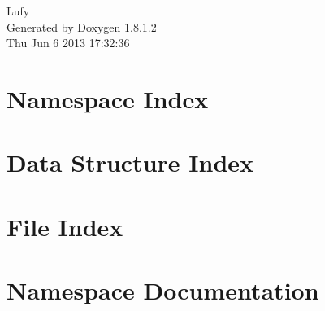 \documentclass{book}
\begin{document}
\hypersetup{pageanchor=false,citecolor=blue}
\begin{titlepage}
\vspace*{7cm}
\begin{center}
{\Large Lufy }\\
\vspace*{1cm}
{\large Generated by Doxygen 1.8.1.2}\\
\vspace*{0.5cm}
{\small Thu Jun 6 2013 17:32:36}\\
\end{center}
\end{titlepage}
\clearemptydoublepage
{}
\tableofcontents
\clearemptydoublepage
{}
\hypersetup{pageanchor=true,citecolor=blue}
\chapter{Namespace Index}

\chapter{Data Structure Index}

\chapter{File Index}

\chapter{Namespace Documentation}

\end{document}
